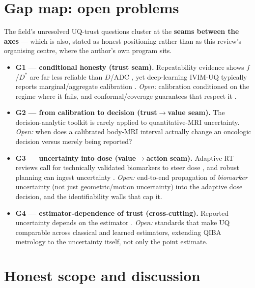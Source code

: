 \documentclass[review,number]{elsarticle}
\newcommand{\Dstar}{D^{*}}
\begin{document}
\section{Gap map: open problems}
\label{sec:gaps}

The field's unresolved UQ-trust questions cluster at the \textbf{seams between the axes}
--- which is also, stated as honest positioning rather than as this review's organising
centre, where the author's own program sits.

\begin{itemize}
  \item \textbf{G1 --- conditional honesty (trust seam).} Repeatability evidence shows
    $f$/$\Dstar$ are far less reliable than $D$/ADC
    \cite{sun2017,yang2019,simchick2024}, yet deep-learning IVIM-UQ typically reports
    marginal/aggregate calibration \cite{casali2025}. \emph{Open:} calibration
    conditioned on the regime where it fails, and conformal/coverage guarantees that
    respect it \cite{angelopoulos2021,ovadia2019}.
  \item \textbf{G2 --- from calibration to decision (trust$\rightarrow$value seam).} The
    decision-analytic toolkit \cite{vickers2006,zhao2021} is rarely applied to
    quantitative-MRI uncertainty. \emph{Open:} when does a calibrated body-MRI interval
    actually change an oncologic decision versus merely being reported?
  \item \textbf{G3 --- uncertainty into dose (value$\rightarrow$action seam).}
    Adaptive-RT reviews call for technically validated biomarkers to steer dose
    \cite{otazo2021,vanhoudt2021qib}, and robust planning can ingest uncertainty
    \cite{unkelbach2018}. \emph{Open:} end-to-end propagation of \emph{biomarker}
    uncertainty (not just geometric/motion uncertainty) into the adaptive dose decision,
    and the identifiability walls that cap it.
  \item \textbf{G4 --- estimator-dependence of trust (cross-cutting).} Reported
    uncertainty depends on the estimator \cite{barbieri2016,barbieri2020}. \emph{Open:}
    standards that make UQ comparable across classical and learned estimators, extending
    QIBA metrology \cite{raunig2015,sullivan2015} to the uncertainty itself, not only the
    point estimate.
\end{itemize}

\section{Honest scope and discussion}
\label{sec:scope-honest}
\end{document}

